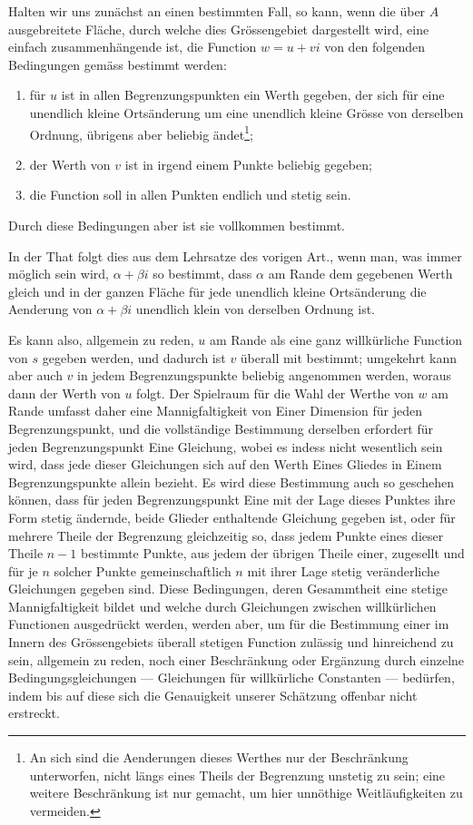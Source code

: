 \documentclass[12pt,a4paper]{book}
\theoremstyle{definition}
\theoremstyle{remark}
\begin{document}
Halten wir uns zunächst an einen bestimmten Fall, so kann, wenn die über $A$ ausgebreitete Fläche, durch welche dies Grössengebiet dargestellt wird, eine einfach zusammenhängende ist, die Function $w = u + vi$ von den folgenden Bedingungen gemäss bestimmt werden:
\begin{enumerate}
\item für $u$ ist in allen Begrenzungspunkten ein Werth gegeben, der sich für eine unendlich kleine Ortsänderung um eine unendlich kleine Grösse von derselben Ordnung, übrigens aber beliebig ändet\footnote{An sich sind die Aenderungen dieses Werthes nur der Beschränkung unterworfen, nicht längs eines Theils der Begrenzung unstetig zu sein; eine weitere Beschränkung ist nur gemacht, um hier unnöthige Weitläufigkeiten zu vermeiden.};
\item der Werth von $v$ ist in irgend einem Punkte beliebig gegeben;
\item die Function soll in allen Punkten endlich und stetig sein.
\end{enumerate}
Durch diese Bedingungen aber ist sie vollkommen bestimmt.

In der That folgt dies aus dem Lehrsatze des vorigen Art., wenn man, was immer möglich sein wird, $\alpha + \beta i$ so bestimmt, dass $\alpha$ am Rande dem gegebenen Werth gleich und in der ganzen Fläche für jede unendlich kleine Ortsänderung die Aenderung von $\alpha + \beta i$ unendlich klein von derselben Ordnung ist.

Es kann also, allgemein zu reden, $u$ am Rande als eine ganz willkürliche Function von $s$ gegeben werden, und dadurch ist $v$ überall mit bestimmt; umgekehrt kann aber auch $v$ in jedem Begrenzungspunkte beliebig angenommen werden, woraus dann der Werth von $u$ folgt. Der Spielraum für die Wahl der Werthe von $w$ am Rande umfasst daher eine Mannigfaltigkeit von Einer Dimension für jeden Begrenzungspunkt, und die vollständige Bestimmung derselben erfordert für jeden Begrenzungspunkt Eine Gleichung, wobei es indess nicht wesentlich sein wird, dass jede dieser Gleichungen sich auf den Werth Eines Gliedes in Einem Begrenzungspunkte allein bezieht. Es wird diese Bestimmung auch so geschehen können, dass für jeden Begrenzungspunkt Eine mit der Lage dieses Punktes ihre Form stetig ändernde, beide Glieder enthaltende Gleichung gegeben ist, oder für mehrere Theile der Begrenzung gleichzeitig so, dass jedem Punkte eines dieser Theile $n - 1$ bestimmte Punkte, aus jedem der übrigen Theile einer, zugesellt und für je $n$ solcher Punkte gemeinschaftlich $n$ mit ihrer Lage stetig veränderliche Gleichungen gegeben sind. Diese Bedingungen, deren Gesammtheit eine stetige Mannigfaltigkeit bildet und welche durch Gleichungen zwischen willkürlichen Functionen ausgedrückt werden, werden aber, um für die Bestimmung einer im Innern des Grössengebiets überall stetigen Function zulässig und hinreichend zu sein, allgemein zu reden, noch einer Beschränkung oder Ergänzung durch einzelne Bedingungsgleichungen --- Gleichungen für willkürliche Constanten --- bedürfen, indem bis auf diese sich die Genauigkeit unserer Schätzung offenbar nicht erstreckt.
\end{document}
